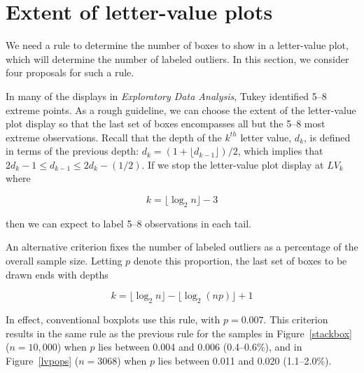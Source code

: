 \documentclass[oneside]{article}
\begin{document}
\section{Extent of letter-value plots}
\label{sec:extent}

We need a rule to determine the number of boxes to show in a letter-value plot, which will determine the number of labeled outliers. In this section, we consider four proposals for such a rule.

In many of the displays in \textit{Exploratory Data Analysis}, Tukey identified 5--8 extreme points. As a rough guideline, we can choose the extent of the letter-value plot display so that the last set of boxes encompasses all but the 5--8 most extreme observations. Recall that the depth of the $k^{th}$ letter value, $d_k$, is defined in terms of the previous depth: $d_k = (1 + \lfloor d_{k-1} \rfloor)/2$, which implies that $2 d_{k} -1 \leq d_{k-1} \leq 2 d_k - (1/2)$. If we stop the letter-value plot display at $LV_k$ where 

\begin{equation}
k = \lfloor \log_2 n \rfloor - 3
\end{equation}

\noindent then we can expect to label 5--8 observations in each tail.  %

An alternative criterion fixes the number of labeled outliers as a percentage of the overall sample size. Letting $p$ denote this proportion, the last set of boxes to be drawn ends with depths

\begin{equation}
k = \lfloor \log_2 n \rfloor - \lfloor \log_2 (np) \rfloor + 1
\end{equation}

\noindent In effect, conventional boxplots use this rule, with $p = 0.007$. This criterion results in the same rule as the previous rule for the samples in Figure~\ref{stackbox} ($n = 10,000$) when $p$ lies between 0.004 and 0.006 (0.4--0.6\%), and in Figure~\ref{lvpops} ($n = 3068$) when $p$ lies between 0.011 and 0.020 (1.1--2.0\%).
\end{document}
